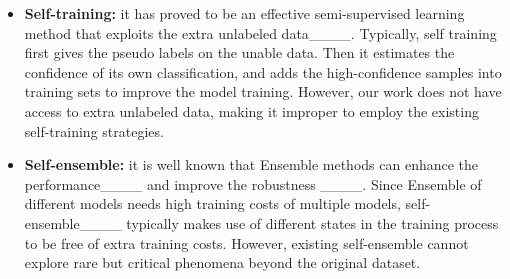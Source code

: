 \begin{itemize}
\item \textbf{Self-training:} it has proved to be an effective semi-supervised learning method that exploits the extra unlabeled data____. 
Typically, self training first gives the pseudo labels on the unable data. Then it estimates the confidence of its own classification, and adds the high-confidence samples into training sets to improve the model training. 
However, our work does not have access to extra unlabeled data, making it improper to employ the existing self-training strategies.

\item \textbf{Self-ensemble:} it is well known that Ensemble methods can enhance the performance____ and improve the robustness ____. 
Since Ensemble of different models needs high training costs of multiple models,
self-ensemble____ typically makes use of different states in the training process to be free of extra training costs. 
However, existing self-ensemble cannot explore rare but critical phenomena beyond
the original dataset.

\end{itemize}